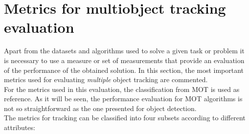 \section{Metrics for multiobject tracking evaluation}
Apart from the datasets and algorithms used to solve a given task or problem it is necessary to use a measure or set of measurements that provide an evaluation of the performance of the obtained solution. In this section, the most important metrics used for evaluating \textit{multiple} object tracking are commented.\\
For the metrics used in this evaluation, the classification from MOT \cite{milan2016mot16} is used as reference. As it will be seen, the performance evaluation for MOT algorithms is not so straightforward as the one presented for object detection.\\
The metrics for tracking can be classified into four subsets according to different attributes:
